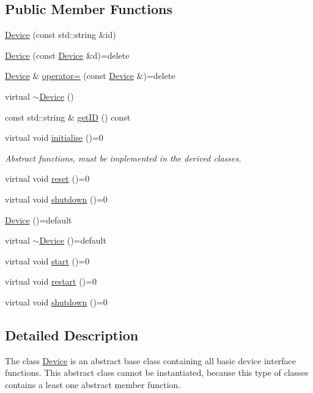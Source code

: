 \subsection*{Public Member Functions}
\begin{DoxyCompactItemize}
\item 
\hyperlink{class_device_a831fcd5aa1de172a75977ef04bbca56a}{Device} (const std\+::string \&id)
\item 
\hyperlink{class_device_ac396693bdad11f7cd4209da76fe651f3}{Device} (const \hyperlink{class_device}{Device} \&d)=delete
\item 
\hyperlink{class_device}{Device} \& \hyperlink{class_device_a25d835db7132fe7f8fd33ace1e19a780}{operator=} (const \hyperlink{class_device}{Device} \&)=delete
\item 
virtual \hyperlink{class_device_af5f3f693be6b0dbde83d03bf7a336d2c}{$\sim$\+Device} ()
\item 
const std\+::string \& \hyperlink{class_device_a682e72b3243a703e7b6080f5f1c9553b}{get\+ID} () const 
\item 
virtual void \hyperlink{class_device_a66d75dab26ca84259877ca3fe5f2c2bd}{initialise} ()=0
\begin{DoxyCompactList}\small\item\em Abstract functions, must be implemented in the derived classes. \end{DoxyCompactList}\item 
virtual void \hyperlink{class_device_a6e43162e890cb40eafb923b0c94d167a}{reset} ()=0
\item 
virtual void \hyperlink{class_device_aab20e3f9dc696c6a1153776d526dcc0b}{shutdown} ()=0
\item 
\hyperlink{class_device_aeedac8c21921d1379d33ffc0e72a7b07}{Device} ()=default
\item 
virtual \hyperlink{class_device_a6fef4f7180512c7517c9696cd95e503a}{$\sim$\+Device} ()=default
\item 
virtual void \hyperlink{class_device_acaacba2e97dfde1b53c34970d2ebaef9}{start} ()=0
\item 
virtual void \hyperlink{class_device_a5d4a86da7f8d97cec939831239a5a032}{restart} ()=0
\item 
virtual void \hyperlink{class_device_aab20e3f9dc696c6a1153776d526dcc0b}{shutdown} ()=0
\end{DoxyCompactItemize}


\subsection{Detailed Description}
The class \hyperlink{class_device}{Device} is an abstract base class containing all basic device interface functions. This abstract class cannot be instantiated, because this type of classes contains a least one abstract member function. 

